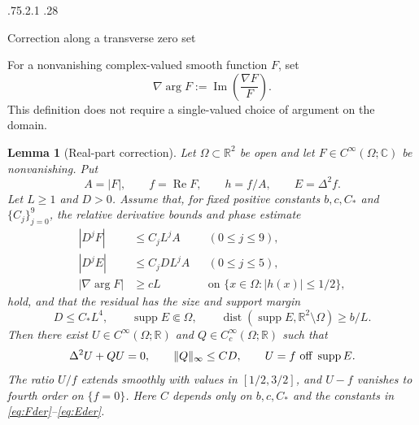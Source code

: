 \documentclass[11pt,a4paper,leqno]{amsart}
\makeatletter
\numberwithin{equation}{section}
\theoremstyle{landisplain}
\newtheorem{lemma}[theorem]{Lemma}
\theoremstyle{landisdefinition}
\theoremstyle{landisremark}
\newcommand{\R}{\mathbb R}
\newcommand{\C}{\mathbb C}
\newcommand{\Rea}{\operatorname{Re}}
\newcommand{\Ima}{\operatorname{Im}}
\newcommand{\supp}{\operatorname{supp}}
\newcommand{\dist}{\operatorname{dist}}
\DeclarePairedDelimiter{\norm}{\lVert}{\rVert}
\renewcommand\subsection{\@startsection{subsection}{2}{\z@}%
  {.75\baselineskip \@plus .2\baselineskip \@minus .1\baselineskip}%
  {.28\baselineskip}%
  {\normalfont\bfseries\raggedright}}
\makeatother
\begin{document}
\subsection{Correction along a transverse zero set}

For a nonvanishing complex-valued smooth function $F$, set
\[
 \nabla\arg F:=\Ima\left(\frac{\nabla F}{F}\right).
\]
This definition does not require a single-valued choice of
argument on the domain.

\begin{lemma}[Real-part correction]\label{lem:repair}
Let $\Omega\subset\R^2$ be open and let
$F\in C^\infty(\Omega;\C)$ be nonvanishing. Put
\[
 A=|F|,\qquad f=\Rea F,\qquad h=f/A,\qquad E=\Delta^2f.
\]
Let $L\ge1$ and $D>0$. Assume that, for fixed positive constants
$b,c,C_*$ and $\{C_j\}_{j=0}^9$, the relative derivative bounds
and phase estimate
\begin{align}
 |D^jF|&\le C_jL^jA &&(0\le j\le9),\label{eq:Fder}\\
 |D^jE|&\le C_jDL^jA &&(0\le j\le5),\label{eq:Eder}\\
 |\nabla\arg F|&\ge cL
 &&\text{on }\{x\in\Omega:|h(x)|\le1/2\},\label{eq:phase}
\end{align}
hold, and that the residual has the size and support margin
\begin{equation}\label{eq:margin}
 D\le C_*L^4,\qquad
 \supp E\Subset\Omega,\qquad
 \dist(\supp E,\R^2\setminus\Omega)\ge b/L.
\end{equation}
Then there exist $U\in C^\infty(\Omega;\R)$ and
$Q\in C_c^\infty(\Omega;\R)$ such that
\begin{equation}\label{eq:repair-result}
 \Delta^2U+QU=0,\qquad \norm Q_\infty\le CD,
 \qquad U=f\ \text{off }\supp E.
\end{equation}
The ratio $U/f$ extends smoothly with values in $[1/2,3/2]$,
and $U-f$ vanishes to fourth order on $\{f=0\}$. Here $C$
depends only on $b,c,C_*$ and the constants in
\eqref{eq:Fder}--\eqref{eq:Eder}.
\end{lemma}
\end{document}
